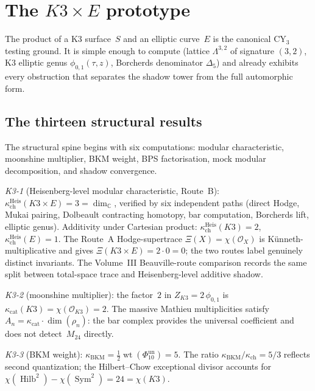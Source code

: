 \documentclass[11pt]{article}
\theoremstyle{plain}
\theoremstyle{definition}
\theoremstyle{remark}
\newcommand{\cO}{\mathcal{O}}
\newcommand{\bC}{\mathbb{C}}
\begin{document}

\section{The $K3 \times E$ prototype}
\label{sec:k3e}

The product of a K3 surface~$S$ and an elliptic curve~$E$ is the
canonical CY$_3$ testing ground.  It is simple enough to compute
(lattice $\Lambda^{3,2}$ of signature $(3,2)$, K3 elliptic genus
$\phi_{0,1}(\tau, z)$, Borcherds denominator $\Delta_5$) and
already exhibits every obstruction that separates the shadow tower
from the full automorphic form.

\subsection{The thirteen structural results}

The structural spine begins with six computations: modular
characteristic, moonshine multiplier, BKM weight, BPS factorisation,
mock modular decomposition, and shadow convergence.

\emph{K3-1} (Heisenberg-level modular characteristic, Route~B):
$\kappa_{\mathrm{ch}}^{\mathrm{Heis}}(K3 \times E) = 3 = \dim_\bC$,
verified by six independent paths (direct Hodge, Mukai pairing,
Dolbeault contracting homotopy, bar computation, Borcherds lift,
elliptic genus).  Additivity under Cartesian product:
$\kappa_{\mathrm{ch}}^{\mathrm{Heis}}(K3) = 2$,
$\kappa_{\mathrm{ch}}^{\mathrm{Heis}}(E) = 1$.  The Route~A
Hodge-supertrace $\Xi(X)=\chi(\cO_X)$ is K\"unneth-multiplicative and gives
$\Xi(K3 \times E) = 2 \cdot 0 = 0$; the two routes label
genuinely distinct invariants.  The Volume~III Beauville-route
comparison records the same split between total-space trace and
Heisenberg-level additive shadow.

\emph{K3-2} (moonshine multiplier): the factor~$2$ in
$Z_{K3} = 2\,\phi_{0,1}$ is
$\kappa_{\mathrm{cat}}(K3) = \chi(\cO_{K3}) = 2$.  The massive
Mathieu multiplicities satisfy
$A_n = \kappa_{\mathrm{cat}} \cdot \dim(\rho_n)$: the bar complex
provides the universal coefficient and does not detect~$M_{24}$
directly.

\emph{K3-3} (BKM weight):
$\kappa_{\mathrm{BKM}} = \frac{1}{2}\operatorname{wt}(\Phi_{10}^{\mathrm{un}})
= 5$.  The ratio
$\kappa_{\mathrm{BKM}}/\kappa_{\mathrm{ch}} = 5/3$ reflects
second quantization; the Hilbert--Chow exceptional divisor accounts
for $\chi(\operatorname{Hilb}^2) - \chi(\operatorname{Sym}^2) =
24 = \chi(K3)$.
\end{document}
